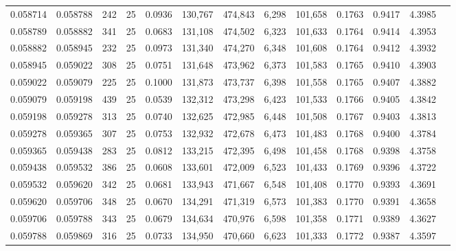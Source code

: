 \begin{tabular}{rrrrrrrrrrrrr}
0.058714 & 0.058788 &   242 &  25 &                                     0.0936 & 130,767 & 474,843 &   6,298 & 101,658 & 0.1763 & 0.9417 & 4.3985 \\
0.058789 & 0.058882 &   341 &  25 &                                     0.0683 & 131,108 & 474,502 &   6,323 & 101,633 & 0.1764 & 0.9414 & 4.3953 \\
0.058882 & 0.058945 &   232 &  25 &                                     0.0973 & 131,340 & 474,270 &   6,348 & 101,608 & 0.1764 & 0.9412 & 4.3932 \\
0.058945 & 0.059022 &   308 &  25 &                                     0.0751 & 131,648 & 473,962 &   6,373 & 101,583 & 0.1765 & 0.9410 & 4.3903 \\
0.059022 & 0.059079 &   225 &  25 &                                     0.1000 & 131,873 & 473,737 &   6,398 & 101,558 & 0.1765 & 0.9407 & 4.3882 \\
0.059079 & 0.059198 &   439 &  25 &                                     0.0539 & 132,312 & 473,298 &   6,423 & 101,533 & 0.1766 & 0.9405 & 4.3842 \\
0.059198 & 0.059278 &   313 &  25 &                                     0.0740 & 132,625 & 472,985 &   6,448 & 101,508 & 0.1767 & 0.9403 & 4.3813 \\
0.059278 & 0.059365 &   307 &  25 &                                     0.0753 & 132,932 & 472,678 &   6,473 & 101,483 & 0.1768 & 0.9400 & 4.3784 \\
0.059365 & 0.059438 &   283 &  25 &                                     0.0812 & 133,215 & 472,395 &   6,498 & 101,458 & 0.1768 & 0.9398 & 4.3758 \\
0.059438 & 0.059532 &   386 &  25 &                                     0.0608 & 133,601 & 472,009 &   6,523 & 101,433 & 0.1769 & 0.9396 & 4.3722 \\
0.059532 & 0.059620 &   342 &  25 &                                     0.0681 & 133,943 & 471,667 &   6,548 & 101,408 & 0.1770 & 0.9393 & 4.3691 \\
0.059620 & 0.059706 &   348 &  25 &                                     0.0670 & 134,291 & 471,319 &   6,573 & 101,383 & 0.1770 & 0.9391 & 4.3658 \\
0.059706 & 0.059788 &   343 &  25 &                                     0.0679 & 134,634 & 470,976 &   6,598 & 101,358 & 0.1771 & 0.9389 & 4.3627 \\
0.059788 & 0.059869 &   316 &  25 &                                     0.0733 & 134,950 & 470,660 &   6,623 & 101,333 & 0.1772 & 0.9387 & 4.3597 \\

\end{tabular}
